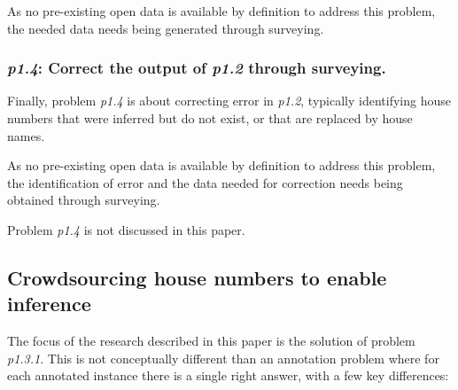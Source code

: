 As no pre-existing open data is available by definition to address this problem, the needed data needs being generated through surveying. 

\subsubsection{{\it p1.4}: Correct the output of {\it p1.2} through surveying.} 

Finally, problem {\it p1.4} is about correcting error in {\it p1.2}, typically identifying house numbers that were inferred but do not exist, or that are replaced by house names.
        
As no pre-existing open data is available by definition to address this problem, the identification of error and the data needed for correction needs being obtained through surveying. 

Problem {\it p1.4} is not discussed in this paper.

\subsection{Crowdsourcing house numbers to enable inference}

The focus of the research described in this paper is the solution of problem {\it p1.3.1}. This is not conceptually different than an annotation problem where for each annotated instance there is a single right answer, with a few key differences:
    
